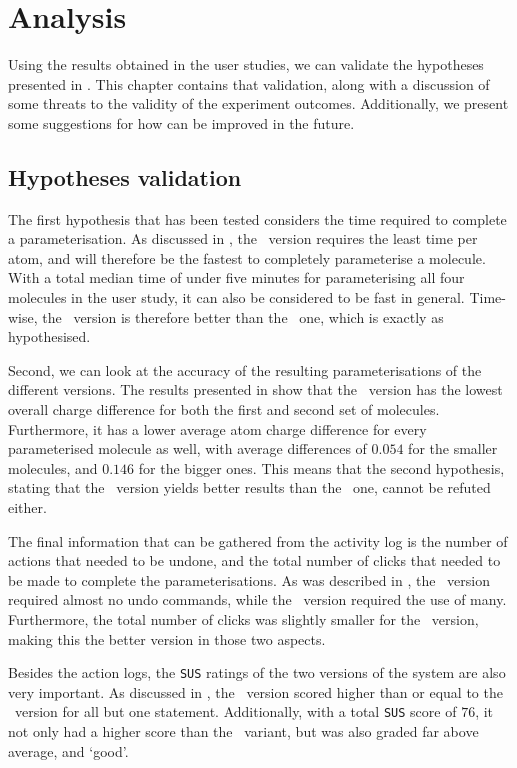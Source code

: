 \chapter{Analysis}

Using the results obtained in the user studies, we can validate the hypotheses presented in . This chapter contains that validation, along with a discussion of some threats to the validity of the experiment outcomes. Additionally, we present some suggestions for how \oframp{} can be improved in the future.



\section{Hypotheses validation}
The first hypothesis that has been tested considers the time required to complete a parameterisation. As discussed in , the \IDb\ version requires the least time per atom, and will therefore be the fastest to completely parameterise a molecule. With a total median time of under five minutes for parameterising all four molecules in the user study, it can also be considered to be fast in general. Time-wise, the \IDb\ version is therefore better than the \IDa\ one, which is exactly as hypothesised.

Second, we can look at the accuracy of the resulting parameterisations of the different versions. The results presented in  show that the \IDa\ version has the lowest overall charge difference for both the first and second set of molecules. Furthermore, it has a lower average atom charge difference for every parameterised molecule as well, with average differences of $0.054$ for the smaller molecules, and $0.146$ for the bigger ones. This means that the second hypothesis, stating that the \IDa\ version yields better results than the \IDb\ one, cannot be refuted either.

The final information that can be gathered from the activity log is the number of actions that needed to be undone, and the total number of clicks that needed to be made to complete the parameterisations. As was described in , the \IDa\ version required almost no undo commands, while the \IDb\ version required the use of many. Furthermore, the total number of clicks was slightly smaller for the \IDa\ version, making this the better version in those two aspects.

Besides the action logs, the \verb|SUS| ratings of the two versions of the system are also very important. As discussed in , the \IDa\ version scored higher than or equal to the \IDb\ version for all but one statement. Additionally, with a total \verb|SUS| score of $76$, it not only had a higher score than the \IDb\ variant, but was also graded far above average, and `good'.

